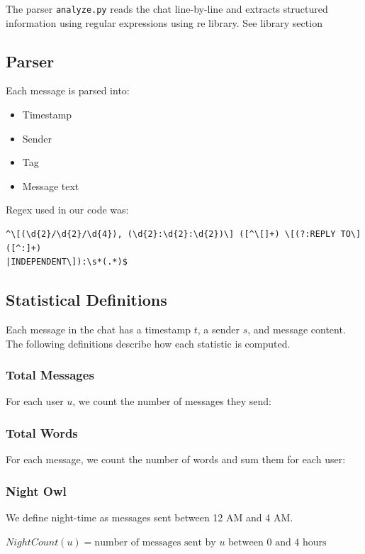 \documentclass[12pt]{article}
\begin{document}
The parser \texttt{analyze.py} reads the chat line-by-line and extracts structured information using regular expressions using re library. See library section \cite{python}

\subsection{Parser}

Each message is parsed into:
\begin{itemize}
\item Timestamp
\item Sender
\item Tag 
\item Message text
\end{itemize}

Regex used in our code was:
\begin{verbatim}
^\[(\d{2}/\d{2}/\d{4}), (\d{2}:\d{2}:\d{2})\] ([^\[]+) \[(?:REPLY TO\]([^:]+)
|INDEPENDENT\]):\s*(.*)$
\end{verbatim}

\subsection{Statistical Definitions}

Each message in the chat has a timestamp $t$, a sender $s$, and message content. The following definitions describe how each statistic is computed.

\subsubsection{Total Messages}

For each user $u$, we count the number of messages they send:

\subsubsection{Total Words}

For each message, we count the number of words and sum them for each user:


\subsubsection{Night Owl}

We define night-time as messages sent between 12 AM and 4 AM.

$NightCount(u) = \text{number of messages sent by } u \text{ between 0 and 4 hours}$
\end{document}
